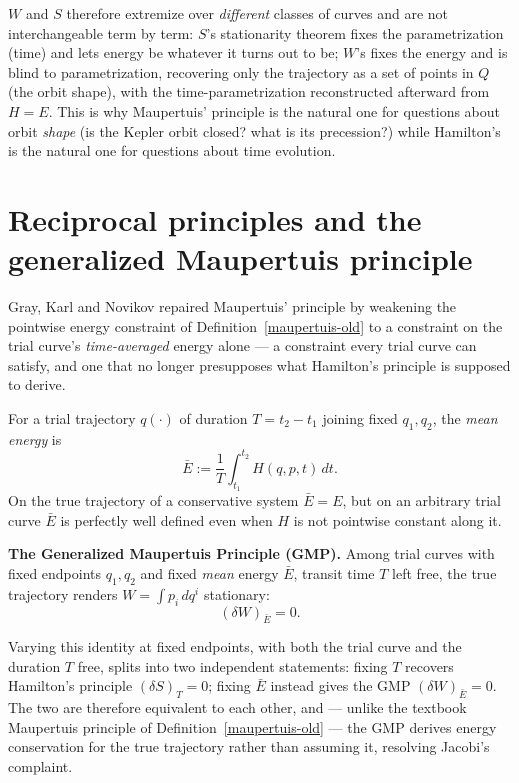 $W$ and $S$ therefore extremize over \emph{different} classes of curves and are
not interchangeable term by term: $S$'s stationarity theorem fixes the
parametrization (time) and lets energy be whatever it turns out to be; $W$'s
fixes the energy and is blind to parametrization, recovering only the
trajectory as a set of points in $Q$ (the orbit shape), with the
time-parametrization reconstructed afterward from $H=E$. This is why
Maupertuis' principle is the natural one for questions about orbit \emph{shape}
(is the Kepler orbit closed? what is its precession?) while Hamilton's is the
natural one for questions about time evolution.

\section{Reciprocal principles and the generalized Maupertuis principle}
\label{sec:vp-reciprocal}

Gray, Karl and Novikov repaired Maupertuis' principle by weakening the
pointwise energy constraint of Definition~\ref{maupertuis-old} to a
constraint on the trial curve's \emph{time-averaged} energy alone --- a
constraint every trial curve can satisfy, and one that no longer presupposes
what Hamilton's principle is supposed to derive.

For a trial trajectory $q(\cdot)$ of duration $T=t_2-t_1$ joining fixed
    $q_1,q_2$, the \emph{mean energy} is
\[
\bar E := \frac1T\int_{t_1}^{t_2} H(q,p,t)\,dt .
\]
On the true trajectory of a conservative system $\bar E=E$, but on an arbitrary
    trial curve $\bar E$ is perfectly well defined even when $H$ is not
    pointwise constant along it.

\begin{definition}
\textbf{The Generalized Maupertuis Principle (GMP).} Among trial curves with
    fixed endpoints $q_1,q_2$ and fixed \emph{mean} energy $\bar E$, transit
    time $T$ left free, the true trajectory renders $W=\int p_i\,dq^i$
    stationary:
\[
(\delta W)_{\bar E} = 0 .
\]
\end{definition}

Varying this identity at fixed endpoints, with both the trial curve and the
duration $T$ free, splits into two independent statements: fixing $T$ recovers
Hamilton's principle $(\delta S)_T=0$; fixing $\bar E$ instead gives the GMP
$(\delta W)_{\bar E}=0$. The two are therefore equivalent to each other, and
--- unlike the textbook Maupertuis principle of
Definition~\ref{maupertuis-old} --- the GMP derives energy conservation for
the true trajectory rather than assuming it, resolving Jacobi's complaint.


